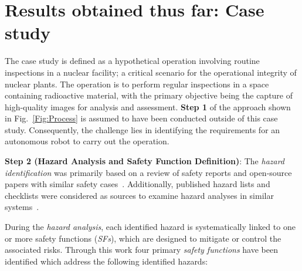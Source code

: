 \documentclass[conference]{IEEEtran}
\begin{document}
\section{Results obtained thus far: Case study}
\label{sec:case_study}

The case study is defined as a hypothetical operation involving routine inspections in a nuclear facility; a critical scenario for the operational integrity of nuclear plants. The operation is to perform regular inspections in a space containing radioactive material, with the primary objective being the capture of high-quality images for analysis and assessment. \textbf{Step 1} of the approach shown in Fig.~\ref{Fig:Process} is assumed to have been conducted outside of this case study. Consequently, the challenge lies in identifying the requirements for an autonomous robot to carry out the operation. \medskip%

\noindent\textbf{Step 2 (Hazard Analysis and Safety Function Definition)}:
The \textit{hazard identification} was primarily based on a review of safety reports and open-source papers with similar safety cases~\cite{InspectionRoverCaseStudy,RequirementsRP}. Additionally, published hazard lists and checklists were considered as sources to examine hazard analyses in similar systems~\cite{HazardsCheckList}.

During the \textit{hazard analysis}, each identified hazard is systematically linked to one or more safety functions (\textit{SFs}), which are designed to mitigate or control the associated risks. %
Through this work four primary \textit{safety functions} have been identified which address the following identified hazards:
\end{document}
